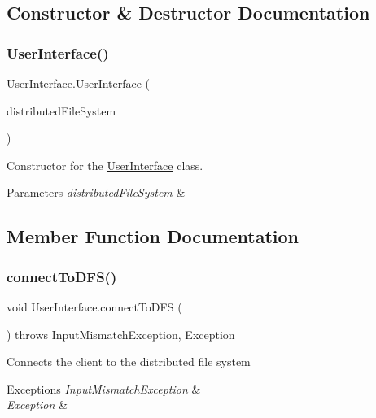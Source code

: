 \subsection{Constructor \& Destructor Documentation}
\mbox{\label{class_user_interface_ae4be0a3dc956ead335dbb0c627847b1f}} 
\subsubsection{\texorpdfstring{User\+Interface()}{UserInterface()}}
{\footnotesize\ttfamily User\+Interface.\+User\+Interface (\begin{DoxyParamCaption}\item[{\mbox{\hyperlink{class_d_f_s}{D\+FS}}}]{distributed\+File\+System }\end{DoxyParamCaption})\hspace{0.3cm}{\ttfamily [inline]}}

Constructor for the \mbox{\hyperlink{class_user_interface}{User\+Interface}} class. 
\begin{DoxyParams}{Parameters}
{\em distributed\+File\+System} & \\
\hline
\end{DoxyParams}


\subsection{Member Function Documentation}
\mbox{\label{class_user_interface_ac366637e9291b357f85f67a58070e666}} 
\subsubsection{\texorpdfstring{connect\+To\+D\+F\+S()}{connectToDFS()}}
{\footnotesize\ttfamily void User\+Interface.\+connect\+To\+D\+FS (\begin{DoxyParamCaption}{ }\end{DoxyParamCaption}) throws Input\+Mismatch\+Exception, Exception\hspace{0.3cm}{\ttfamily [inline]}}

Connects the client to the distributed file system 
\begin{DoxyExceptions}{Exceptions}
{\em Input\+Mismatch\+Exception} & \\
\hline
{\em Exception} & \\
\hline
\end{DoxyExceptions}
\mbox{\label{class_user_interface_a18a2dc6897c3ef551c1d433116b712d1}} 

